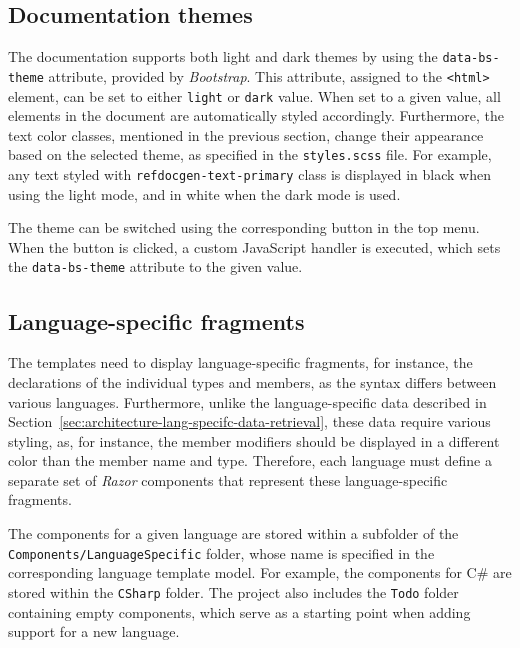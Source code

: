 \subsection{Documentation themes}
\label{sec:ui-themes}

The documentation supports both light and dark themes by using the \texttt{data-bs-theme} attribute, provided by \textit{Bootstrap}.
This attribute, assigned to the \texttt{<html>} element, can be set to either \texttt{light} or \texttt{dark} value.
When set to a given value, all elements in the document are automatically styled accordingly.
Furthermore, the text color classes, mentioned in the previous section, change their appearance based on the selected theme, as specified in the \texttt{styles.scss} file.
For example, any text styled with \texttt{refdocgen-text-primary} class is displayed in black when using the light mode, and in white when the dark mode is used.

The theme can be switched using the corresponding button in the top menu.
When the button is clicked, a custom JavaScript handler is executed, which sets the \texttt{data-bs-theme} attribute to the given value.

\subsection{Language-specific fragments}
\label{sec:ui-language-fragments}

The templates need to display language-specific fragments, for instance, the declarations of the individual types and members, as the syntax differs between various languages.
Furthermore, unlike the language-specific data described in Section~\ref{sec:architecture-lang-specifc-data-retrieval}, these data require various styling, as, for instance, the member modifiers should be displayed in a different color than the member name and type.
Therefore, each language must define a separate set of \textit{Razor} components that represent these language-specific fragments.

The components for a given language are stored within a subfolder of the \texttt{Components/LanguageSpecific} folder, whose name is specified in the corresponding language template model.
For example, the components for C\# are stored within the \texttt{CSharp} folder.
The project also includes the \texttt{Todo} folder containing empty components, which serve as a starting point when adding support for a new language.

